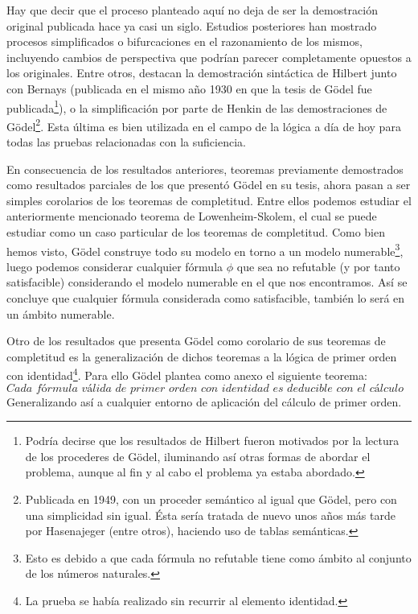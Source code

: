 Hay que decir que el proceso planteado aquí no deja de ser la demostración original publicada hace ya casi un siglo. Estudios posteriores han mostrado procesos simplificados o bifurcaciones en el
razonamiento de los mismos, incluyendo cambios de perspectiva que podrían parecer completamente opuestos a los originales. Entre otros, destacan la demostración sintáctica de Hilbert junto con Bernays
(publicada en el mismo año 1930 en que la tesis de Gödel fue publicada\footnote{Podría decirse que los resultados de Hilbert fueron motivados por la lectura de los procederes de Gödel, iluminando así otras
formas de abordar el problema, aunque al fin y al cabo el problema ya estaba abordado.}), o la simplificación por parte de Henkin de las demostraciones de Gödel\footnote{Publicada en 1949, con un proceder 
semántico al igual que Gödel, pero con una simplicidad sin igual. Ésta sería tratada de nuevo unos años más tarde por Hasenajeger (entre otros), haciendo uso de tablas semánticas.}. Esta última 
es bien utilizada en el campo de la lógica a día de hoy para todas las pruebas relacionadas con la suficiencia.

En consecuencia de los resultados anteriores, teoremas previamente demostrados como resultados parciales de los que presentó Gödel en su tesis, ahora pasan a ser simples corolarios de los teoremas de completitud.
Entre ellos podemos estudiar el anteriormente mencionado teorema de Lowenheim-Skolem, el cual se puede estudiar como un caso particular de los teoremas de completitud. Como bien hemos visto, Gödel construye
todo su modelo en torno a un modelo numerable\footnote{Esto es debido a que cada fórmula no refutable tiene como ámbito al conjunto de los números naturales.}, luego podemos considerar cualquier fórmula $\phi$
que sea no refutable (y por tanto satisfacible) considerando el modelo numerable en el que nos encontramos. Así se concluye que cualquier fórmula considerada como satisfacible, también lo será en un ámbito numerable.

Otro de los resultados que presenta Gödel como corolario de sus teoremas de completitud es la generalización de dichos teoremas a la lógica de primer orden con identidad\footnote{La prueba se había realizado 
sin recurrir al elemento identidad.}. Para ello Gödel plantea como anexo el siguiente teorema:
\begin{equation}\label{th:God_Comp_VII}
    \textit{Cada fórmula válida de primer orden con identidad es deducible con el cálculo correspondiente.}
\end{equation}
Generalizando así a cualquier entorno de aplicación del cálculo de primer orden.

